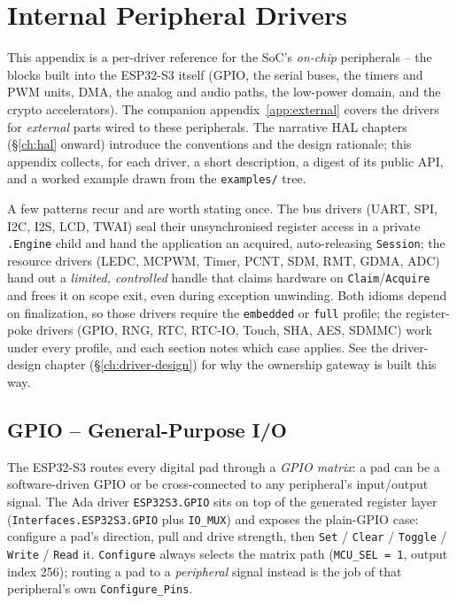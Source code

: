 \chapter{Internal Peripheral Drivers}
\label{app:internal}

This appendix is a per-driver reference for the SoC's \emph{on-chip} peripherals
-- the blocks built into the ESP32-S3 itself (GPIO, the serial buses, the
timers and PWM units, DMA, the analog and audio paths, the low-power domain, and
the crypto accelerators). The companion appendix~\ref{app:external} covers the
drivers for \emph{external} parts wired to these peripherals. The narrative HAL
chapters (\S\ref{ch:hal} onward) introduce the conventions and the design
rationale; this appendix collects, for each driver, a short description, a digest
of its public API, and a worked example drawn from the \texttt{examples/} tree.

A few patterns recur and are worth stating once. The bus drivers (UART, SPI,
I2C, I2S, LCD, TWAI) seal their unsynchronised register access in a private
\texttt{.Engine} child and hand the application an acquired, auto-releasing
\texttt{Session}; the resource drivers (LEDC, MCPWM, Timer, PCNT, SDM, RMT, GDMA,
ADC) hand out a \emph{limited, controlled} handle that claims hardware on
\texttt{Claim}/\texttt{Acquire} and frees it on scope exit, even during exception
unwinding. Both idioms depend on finalization, so those drivers require the
\texttt{embedded} or \texttt{full} profile; the register-poke drivers (GPIO,
RNG, RTC, RTC-IO, Touch, SHA, AES, SDMMC) work under every profile, and each
section notes which case applies. See the driver-design chapter
(\S\ref{ch:driver-design}) for why the ownership gateway is built this way.

\section{GPIO -- General-Purpose I/O}
\label{app:int:gpio}

The ESP32-S3 routes every digital pad through a \emph{GPIO matrix}: a pad can be
a software-driven GPIO or be cross-connected to any peripheral's input/output
signal. The Ada driver \texttt{ESP32S3.GPIO} sits on top of the generated
register layer (\texttt{Interfaces.ESP32S3.GPIO} plus \texttt{IO\_MUX}) and
exposes the plain-GPIO case: configure a pad's direction, pull and drive
strength, then \texttt{Set} / \texttt{Clear} / \texttt{Toggle} / \texttt{Write}
/ \texttt{Read} it. \texttt{Configure} always selects the matrix path
(\texttt{MCU\_SEL = 1}, output index 256); routing a pad to a \emph{peripheral}
signal instead is the job of that peripheral's own \texttt{Configure\_Pins}.

